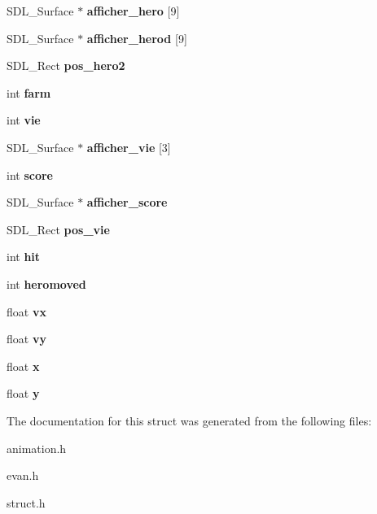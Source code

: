 \begin{DoxyCompactItemize}
S\+D\+L\+\_\+\+Surface $\ast$ {\bfseries afficher\+\_\+hero} \mbox{[}9\mbox{]}
\item 
\mbox{\label{structhero_a1854947b557e8616030b71a843cbf374}} 
S\+D\+L\+\_\+\+Surface $\ast$ {\bfseries afficher\+\_\+herod} \mbox{[}9\mbox{]}
\item 
\mbox{\label{structhero_ae21dc2bbecf1ef9b41ca5258ca0c4c9c}} 
S\+D\+L\+\_\+\+Rect {\bfseries pos\+\_\+hero2}
\item 
\mbox{\label{structhero_a864bf6a159fba501fca768cc17c5f7e4}} 
int {\bfseries farm}
\item 
\mbox{\label{structhero_a5887140c26217e8f45870ee09224ff94}} 
int {\bfseries vie}
\item 
\mbox{\label{structhero_af7949d460c6d296359cc9fe8daf6fd4d}} 
S\+D\+L\+\_\+\+Surface $\ast$ {\bfseries afficher\+\_\+vie} \mbox{[}3\mbox{]}
\item 
\mbox{\label{structhero_ad95606e4c167095066a7d314620d99b5}} 
int {\bfseries score}
\item 
\mbox{\label{structhero_abba17b62e811f85b2909c2ea19b30a4d}} 
S\+D\+L\+\_\+\+Surface $\ast$ {\bfseries afficher\+\_\+score}
\item 
\mbox{\label{structhero_adbe4f5c90c7c4d99292c65d50dad02b7}} 
S\+D\+L\+\_\+\+Rect {\bfseries pos\+\_\+vie}
\item 
\mbox{\label{structhero_a38a0e660a12c2d6509a6183d05cd135b}} 
int {\bfseries hit}
\item 
\mbox{\label{structhero_ae9fbc87f80d82150fadd3fb20c86bbb0}} 
int {\bfseries heromoved}
\item 
\mbox{\label{structhero_a79f3a7c2bf2a8e40bc1840c4bc0502a7}} 
float {\bfseries vx}
\item 
\mbox{\label{structhero_ac9881c9f77d187cba2636f7ed355cb1a}} 
float {\bfseries vy}
\item 
\mbox{\label{structhero_a26083549c9ec31f32cedef617ab76c8e}} 
float {\bfseries x}
\item 
\mbox{\label{structhero_a0cfaf220a87419e9488fd84213340d03}} 
float {\bfseries y}
\end{DoxyCompactItemize}


The documentation for this struct was generated from the following files\+:\begin{DoxyCompactItemize}
\item 
animation.\+h\item 
evan.\+h\item 
struct.\+h\end{DoxyCompactItemize}
